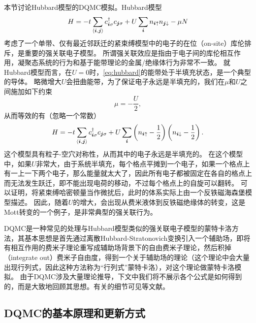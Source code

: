 \documentclass[UTF8]{ctexart}
\newcommand*{\pair}[1]{\langle #1 \rangle}
\begin{document}
本节讨论Hubbard模型的DQMC模拟。Hubbard模型
\begin{equation}
    H = - t\sum_{\pair{\vb*{i}, \vb*{j}}} c^\dagger_{\vb*{i} \sigma} c_{\vb*{j} \sigma} + U \sum_{\vb*{i}} n_{\vb*{i} \uparrow} n_{\vb*{j} \downarrow} - \mu N
    \label{eq:hubbard}
\end{equation} 
考虑了一个单带、仅有最近邻跃迁的紧束缚模型中的电子的在位（on-site）库伦排斥，是重要的强关联电子模型。
所谓强关联效应是指由于电子间的库伦相互作用，凝聚态系统的行为和基于能带理论的金属/绝缘体行为非常不一致。
就Hubbard模型而言，在$U=0$时，\eqref{eq:hubbard}的能带处于半填充状态，是一个典型的导体。
略微增大$U$会扭曲能带，为了保证电子永远是半填充的，我们在$\mu$和$U$之间施加如下约束
\begin{equation}
    \mu = - \frac{U}{2},
\end{equation}
从而等效的有（忽略一个常数）
\begin{equation}
    H = - t\sum_{\pair{\vb*{i}, \vb*{j}}} c^\dagger_{\vb*{i} \sigma} c_{\vb*{j} \sigma} + U \sum_{\vb*{i}} \left( n_{\vb*{i} \uparrow} - \frac{1}{2} \right) \left( n_{\vb*{i} \downarrow} - \frac{1}{2} \right).
    \label{eq:half-filling-hubbard}
\end{equation}
这个模型具有粒子-空穴对称性，从而其中的电子永远是半填充的。
在这个模型中，如果$U$非常大，由于系统半填充，每个格点平摊到一个电子，如果一个格点上有一上一下两个电子，那么能量就太大了，因此所有电子都被固定在各自的格点上而无法发生跃迁，即不能出现电荷的移动，不过每个格点上的自旋可以翻转。
可以证明，将紧束缚哈密顿量当作微扰后，此时的体系实际上由一个反铁磁海森堡模型描述。
因此，随着$U$的增大，会出现从费米液体到反铁磁绝缘体的转变，这是Mott转变的一个例子，是非常典型的强关联行为\cite{fradkin2013field}。

DQMC是一种常见的处理与Hubbard模型类似的强关联电子模型的蒙特卡洛方法，其基本思想是首先通过离散Hubbard-Stratonovich变换引入一个辅助场，即将有相互作用的费米子理论重写成辅助场背景下的自由费米子理论，然后积掉（integrate out）费米子自由度，得到一个关于辅助场的理论（这个理论中会大量出现行列式，因此这种方法称为“行列式”蒙特卡洛），对这个理论做蒙特卡洛模拟。
由于DQMC涉及大量理论推导，下文中我们将不展示各个公式是如何得到的，而是大致地回顾其思想。有关的细节可见\cite{assaad2008world}等文献。

\subsection{DQMC的基本原理和更新方式}
\end{document}
